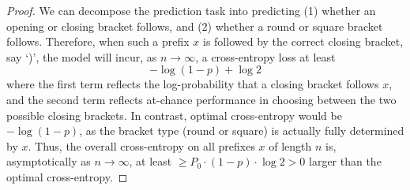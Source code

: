 \documentclass[11pt,a4paper]{article}
\begin{document}
\begin{proof}
We can decompose the prediction task into predicting (1) whether an opening or closing bracket follows, and (2) whether a round or square bracket follows.
Therefore, when such a prefix $x$ is followed by the correct closing bracket, say `)', the model will incur, as $n \rightarrow \infty$, a cross-entropy loss at least
\begin{equation}
    - \log (1-p) + \log 2
\end{equation}
where the first term reflects the log-probability that a closing bracket follows $x$, and the second term reflects at-chance performance in choosing between the two possible closing brackets.
In contrast, optimal cross-entropy would be $-\log (1-p)$, as the bracket type (round or square) is actually fully determined by $x$.
Thus, the overall cross-entropy on all prefixes $x$ of length $n$ is, asymptotically as $n \rightarrow \infty$, at least $\geq P_0 \cdot (1-p) \cdot \log 2 > 0$ larger than the optimal cross-entropy.
\end{proof}





\end{document}

